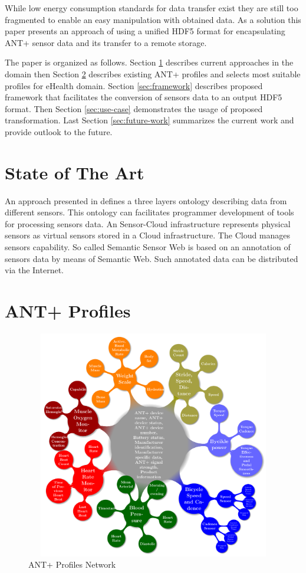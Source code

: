 \documentclass[conference]{IEEEconf}
\begin{document}
While low energy consumption standards for data transfer exist they are still too fragmented to enable an easy manipulation with obtained data. As a solution this paper presents an approach of using a unified HDF5 format for encapsulating ANT+ sensor data and its transfer to a remote storage. 

The paper is organized as follows. Section \ref{sec:state-of-the-art} describes current approaches in the domain then Section \ref{sec:ant-plus-profiles} describes existing ANT+ profiles and selects most suitable profiles for eHealth domain. Section \ref{sec:framework} describes proposed framework that facilitates the conversion of sensors data to an output HDF5 format. Then Section \ref{sec:use-case} demonstrates the usage of proposed transformation. Last Section \ref{sec:future-work} summarizes the current work and provide outlook to the future.

\section{State of The Art}\label{sec:state-of-the-art}

An approach presented in \cite{mehmood2014ontology} defines a three layers ontology describing data from different sensors. This ontology can facilitates programmer development of tools for processing sensors data. An Sensor-Cloud infrastructure \cite{5635688} represents physical sensors as virtual sensors stored in a Cloud infrastructure. The Cloud manages sensors capability. So called Semantic Sensor Web \cite{4557983} is based on an annotation of sensors data by means of Semantic Web. Such annotated data can be distributed via the Internet.


\section{ANT+ Profiles}\label{sec:ant-plus-profiles}

\begin{figure}[ht]
\centering\includegraphics[width=12cm, height=10cm]{AntPlusProfiles}
\caption{\label{AntPlus}ANT+ Profiles Network}
\end{figure}
\end{document}
